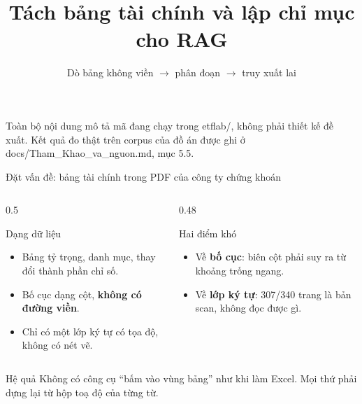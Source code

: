 \documentclass[aspectratio=169,11pt]{beamer}
\title[Kỹ thuật tách bảng và lập chỉ mục]{Tách bảng tài chính và lập chỉ mục cho RAG}
\subtitle[Đặc tả kỹ thuật của hệ thống \texttt{etflab}]{Dò bảng không viền $\rightarrow$ phân đoạn $\rightarrow$ truy xuất lai}
\author{}
\date{}
\newcommand{\src}[1]{{\footnotesize\ttfamily #1}}
\begin{document}
\begin{frame}
  \titlepage
  \vspace{-1.6em}
  {\footnotesize
  Toàn bộ nội dung mô tả mã đang chạy trong \src{etflab/}, không phải thiết kế
  đề xuất. Kết quả đo thật trên corpus của đồ án được ghi ở \src{docs/Tham\_Khao\_va\_nguon.md}, mục 5.5.}
\end{frame}

\begin{frame}{Đặt vấn đề: bảng tài chính trong PDF của công ty chứng khoán}
  \begin{columns}[T]
    \begin{column}{0.5\textwidth}
      \begin{block}{\small Dạng dữ liệu}
        \begin{itemize}\small
          \item Bảng tỷ trọng, danh mục, thay đổi thành phần chỉ số.
          \item Bố cục dạng cột, \textbf{không có đường viền}.
          \item Chỉ có một lớp ký tự có tọa độ, không có nét vẽ.
        \end{itemize}
      \end{block}
    \end{column}
    \begin{column}{0.48\textwidth}
      \begin{alertblock}{\small Hai điểm khó}
        \begin{itemize}\small
          \item Về \textbf{bố cục}: biên cột phải suy ra từ khoảng trống ngang.
          \item Về \textbf{lớp ký tự}: 307/340 trang là bản scan, không đọc được gì.
        \end{itemize}
      \end{alertblock}
    \end{column}
  \end{columns}
  \vspace{0.3em}
  \begin{block}{\small Hệ quả}
    Không có công cụ ``bấm vào vùng bảng'' như khi làm Excel. Mọi thứ phải
    dựng lại từ hộp toạ độ của từng từ.
  \end{block}
\end{frame}
\end{document}
